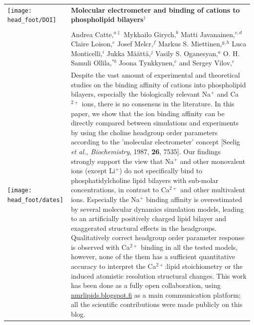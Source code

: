 \documentclass[twoside,twocolumn,9pt]{article}
\begin{document}
  \begin{@twocolumnfalse}
\vspace{3cm}
\sffamily
\begin{tabular}{m{4.5cm} p{13.5cm} }

\texttt{[image: head\_foot/DOI]} & \noindent\LARGE{\textbf{Molecular electrometer and binding of cations to phospholipid bilayers$^\dag$}} \\%
\vspace{0.3cm} & \vspace{0.3cm} \\

 & \noindent\large{Andrea Catte,\textit{$^{a\ddag}$} Mykhailo Girych,\textit{$^{b}$} Matti Javanainen,\textit{$^{c,d}$} Claire Loison,\textit{$^{e}$} Josef Melcr,\textit{$^{f}$} Markus S. Miettinen,\textit{$^{g,h}$} Luca Monticelli,\textit{$^{i}$} Jukka M{\"a}{\"a}tt{\"a},\textit{$^{j}$} Vasily S. Oganesyan,\textit{$^{a}$} O. H. Samuli Ollila,\textit{$^{\ast b}$} Joona Tynkkynen,\textit{$^{c}$} and Sergey Vilov,\textit{$^{e}$}
} \\%

\texttt{[image: head\_foot/dates]} & \noindent\normalsize{
Despite the vast amount of experimental and theoretical studies on the binding affinity of cations into phospholipid bilayers, 
especially the biologically relevant Na$^+$ and Ca$^{2+}$ ions,  there is no consensus in the literature. 
In this paper, we show that the ion binding affinity can be directly compared between simulations and experiments by 
using the choline headgroup order parameters according to the 'molecular electrometer' 
concept [Seelig \textit{et al., Biochemistry}, 1987, \textbf{26}, 7535].
Our findings strongly support the view that Na$^+$ and other monovalent ions
(except Li$^+$) do not specifically bind to phosphatidylcholine lipid bilayers with sub-molar concentrations, 
in contrast to Ca$^{2+}$ and other multivalent ions. Especially the Na$^+$ binding affinity is 
overestimated by several molecular dynamics simulation models, leading to 
an artificially positively charged lipid bilayer and exaggerated structural effects in the headgroups. 
Qualitatively correct headgroup order parameter response is observed with
Ca$^{2+}$ binding in all the tested models, however, none of the them has a sufficient 
quantitative accuracy to interpret the Ca$^{2+}$:lipid stoichiometry or the induced atomistic resolution structural changes.
This work has been done as a fully open collaboration, using \url{nmrlipids.blogspot.fi} as a main communication platform; 
all the scientific contributions were made publicly on this blog. } \\%


\end{tabular}
\end{@twocolumnfalse}
\end{document}
